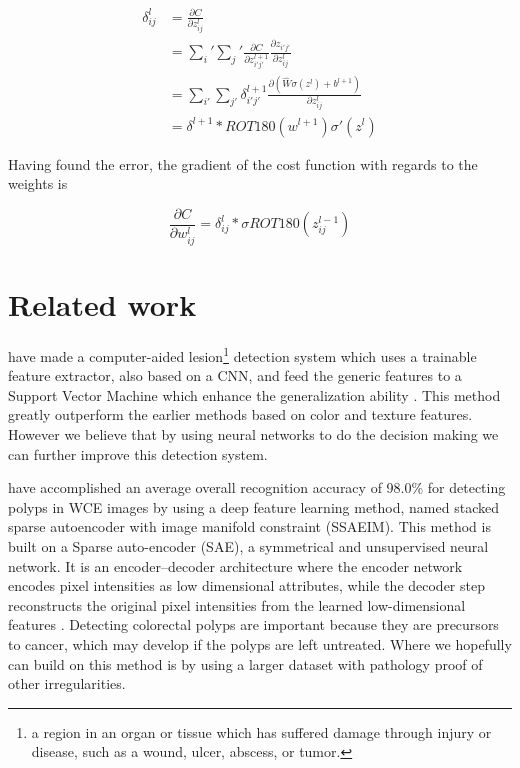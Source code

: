 \documentclass[thesis.tex]{subfiles}
\begin{document}
\begin{equation}
  \begin{aligned}
  \delta_{ij}^l &= \frac{\partial C}{\partial z_{ij}^l} \\
  &= \sum_i' \sum_j' \frac{\partial C}{\partial z_{i'j'}^{l+1}}\frac{\partial z_{i'j'}}{\partial z_{ij}^l} \\
  &= \sum_{i'} \sum_{j'}\delta_{i'j'}^{l+1} \frac{\partial (\hat{W}\sigma(z^l) + b^{l+1})}{\partial z_{ij}^l} \\
  &= \delta^{l+1} * ROT180(w^{l+1})\sigma'(z^l)
  \end{aligned}
\end{equation}

Having found the error, the gradient of the cost function with regards to the weights is

\begin{equation} %
  \frac{\partial C}{\partial w_{ij}^l} = \delta_{ij}^l * \sigma{ROT180(z_{ij}^{l-1})}
\end{equation}




\section{Related work} \label{relatedwork}

\citeauthor*{LesionDetection15} have made a computer-aided lesion\footnote{a region in an organ or tissue which has suffered damage through injury or disease, such as a wound, ulcer, abscess, or tumor.} detection system which uses a trainable feature extractor, also based on a CNN, and feed the generic features to a Support Vector Machine which enhance the generalization ability \cite{LesionDetection15}. This method greatly outperform the earlier methods based on color and texture features. However we believe that by using neural networks to do the decision making we can further improve this detection system. 

\medbreak 
\citeauthor*{DeepLearning17} have accomplished an average overall recognition accuracy of 98.0\% for detecting polyps in WCE images by using a deep feature learning method, named stacked sparse autoencoder with image manifold constraint (SSAEIM). This method is built on a Sparse auto-encoder (SAE), a symmetrical and unsupervised neural network. It is an encoder–decoder architecture where the encoder network encodes pixel intensities as low dimensional attributes, while the decoder step reconstructs the original pixel intensities from the learned low-dimensional features \cite{DeepLearning17}. Detecting colorectal polyps are important because they are precursors to cancer, which may develop if the polyps are left untreated. Where we hopefully can build on this method is by using a larger dataset with pathology proof of other irregularities.
\end{document}
